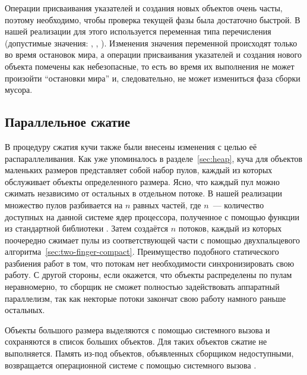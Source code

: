 Операции присваивания указателей и создания новых объектов очень часты, 
поэтому необходимо, чтобы проверка текущей фазы была достаточно быстрой. 
В нашей реализации для этого используется переменная  типа 
перечисления (допустимые значения: , , ). 
Изменения значения переменной  происходят только во время остановок мира, 
а операции присваивания указателей и создания нового объекта помечены как небезопасные, 
то есть во время их выполнения не может произойти ``остановки мира'' и, следовательно, 
не может измениться фаза сборки мусора.


\subsection{Параллельное сжатие}
В процедуру сжатия кучи также были внесены изменения с целью её распараллеливания. 
Как уже упоминалось в разделе~\ref{sec:heap}, куча для объектов маленьких размеров 
представляет собой набор пулов, каждый из которых обслуживает объекты определенного размера. 
Ясно, что каждый пул можно сжимать независимо от остальных в отдельном потоке. 
В нашей реализации множество пулов разбивается на $n$ равных частей, 
где $n$~--- количество доступных на данной системе ядер процессора, 
полученное с помощью функции из стандартной библиотеки 
. 
Затем создаётся $n$ потоков, каждый из которых поочередно сжимает пулы из 
соответствующей части с помощью двухпальцевого алгоритма~\ref{sec:two-finger-compact}. 
Преимущество подобного статического разбиения работ в том, что потокам нет необходимости 
синхронизировать свою работу. 
С другой стороны, если окажется, что объекты распределены по пулам неравномерно, 
то сборщик не сможет полностью задействовать аппаратный параллелизм, так как некторые 
потоки закончат свою работу намного раньше остальных. 

Объекты большого размера выделяются с помощью системного вызова  и 
сохраняются в список больших объектов. 
Для таких объектов сжатие не выполняется. 
Память из-под объектов, объявленных сборщиком недоступными, возвращается операционной 
системе с помощью системного вызова .
